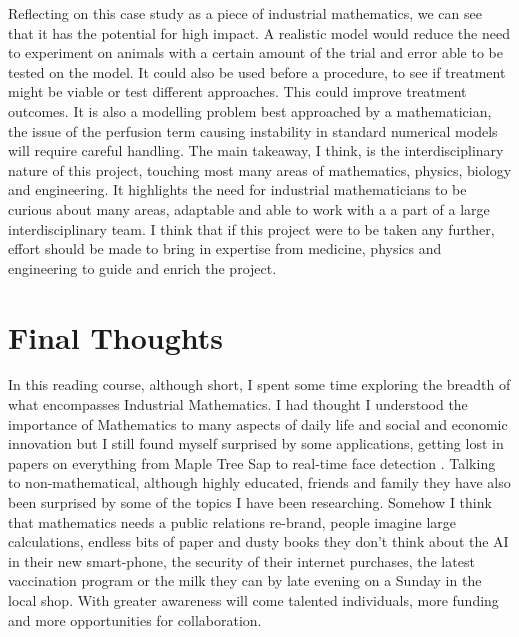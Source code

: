 \documentclass[11pt]{article} %
\begin{document}
Reflecting on this case study as a piece of industrial mathematics, we can see that it has the potential for high impact. A realistic model would reduce the need to experiment on animals with a certain amount of the trial and error able to be tested on the model. It could also be used before a procedure, to see if treatment might be viable or test different approaches. This could improve treatment outcomes. It is also a modelling problem best approached by a mathematician, the issue of the perfusion term causing instability in standard numerical models will require careful handling. The main takeaway, I think, is the interdisciplinary nature of this project, touching most many areas of mathematics, physics, biology and engineering. It highlights the need for industrial mathematicians to be curious about many areas, adaptable and able to work with a a part of a large interdisciplinary team. I think that if this project were to be taken any further, effort should be made to bring in expertise from medicine, physics and engineering to guide and enrich the project. 
  \pagebreak
	\section{Final Thoughts} 
In this reading course, although short, I spent some time exploring the breadth of what encompasses Industrial Mathematics.  I had thought I understood the importance of Mathematics to many aspects of daily life and social and economic innovation but I still found myself surprised by some applications, getting lost in papers on everything from  Maple Tree Sap \cite{Stockie2015} to real-time face detection \cite{Viola2004}. Talking to non-mathematical, although highly educated, friends and family they have also been surprised by some of the topics I have been researching. Somehow I think that mathematics needs a public relations re-brand, people imagine large calculations, endless bits of paper and dusty books they don't think about the AI in their new smart-phone, the security of their internet purchases, the latest vaccination program or the milk they can by late evening on a Sunday in the local shop. With greater awareness will come talented individuals, more funding and more opportunities for collaboration. 
\end{document}
